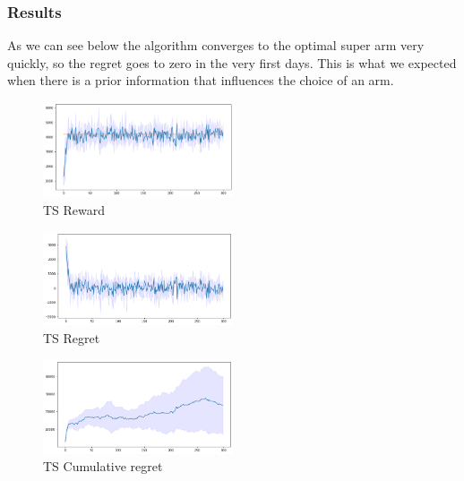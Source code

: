 \subsubsection{Results}
As we can see below the algorithm converges to the optimal super arm very quickly, so the regret goes to zero in the very first days. This is what we expected when there is a prior information that influences the choice of an arm.
\begin{figure}[ht]
    \begin{center}
    \includegraphics[width=0.5\textwidth]{img/TS3.png}
    \caption{TS Reward}
    \label{fig:reward32}
    \end{center}
\end{figure}
\begin{multicols}{2}
    \begin{figure}[H]
        \begin{center}
        \includegraphics[width=0.5\textwidth]{img/TS3_regret.png}
        \caption{TS Regret}
        \label{fig:regret32}
        \end{center}
    \end{figure}
    \columnbreak
    \begin{figure}[H]
        \begin{center}
        \includegraphics[width=0.5\textwidth]{img/TS3_cum_reg.png}
        \caption{TS Cumulative regret}
        \label{fig:cum_reg32}
        \end{center}
    \end{figure}
\end{multicols}
